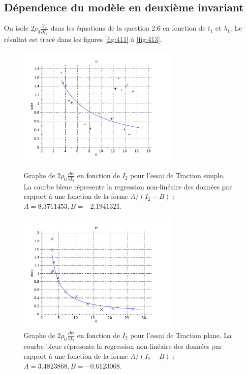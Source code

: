 \documentclass[a4paper,11pt]{article}
\begin{document}
\subsection{Dépendence du modèle en deuxième invariant}
On isole $2 \rho_0 \frac{\partial\psi}{\partial I_2}$ dans les équations de la question 2.6 en fonction de $t_1$ et $\lambda_1$. Le résultat est tracé dans les figures \ref{fig:411} à \ref{fig:413}.
\begin{figure}[!ht]
\centering
\includegraphics[width=0.7\textwidth]{scilab_prof/q411.pdf}
\caption{Graphe de $2 \rho_0 \frac{\partial\psi}{\partial I_2}$ en fonction de $I_2$ pour l'essai de Traction simple. La courbe bleue répresente la regression non-linéaire des données par rapport à une fonction de la forme $A/(I_2-B)$ : $A = 8.3711453, B = -2.1941321$.}
\label{fig:411}

\includegraphics[width=0.7\textwidth]{scilab_prof/q412.pdf}
\caption{Graphe de $2 \rho_0 \frac{\partial\psi}{\partial I_2}$ en fonction de $I_2$ pour l'essai de Traction plane. La courbe bleue répresente la regression non-linéaire des données par rapport à une fonction de la forme $A/(I_2-B)$ : $A = 3.4823868, B = -0.6123068$.}
\label{fig:412}
\end{figure}
\end{document}
